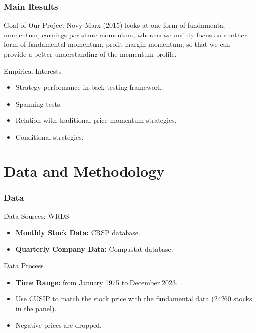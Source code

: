 \documentclass{beamer}
\begin{document}
\begin{frame}
    \frametitle{Main Results}
    \begin{block}{Goal of Our Project}
        {\color{blue} Novy-Marx (2015)} looks at one form of fundamental momentum, earnings per share momentum, 
        whereas we mainly focus on another form of fundamental momentum, profit margin momentum, so that we can provide a better understanding of the momentum profile.
    \end{block}
    \begin{block}{Empirical Interests}
        \begin{itemize}
            \item Strategy performance in back-testing framework.
            \item Spanning tests.
            \item Relation with traditional price momentum strategies.
            \item Conditional strategies.
        \end{itemize}
    \end{block}
\end{frame}

\section{Data and Methodology}
\begin{frame}
    \frametitle{Data}
    \begin{block}{Data Sources: WRDS}
        \begin{itemize}
            \item {\bf Monthly Stock Data:} CRSP database.
            \item {\bf Quarterly Company Data:} Compustat database.
        \end{itemize}
    \end{block}
    \begin{block}{Data Process}
        \begin{itemize}
            \item {\bf Time Range:} from January 1975 to December 2023.
            \item Use CUSIP to match the stock price with the fundamental data (24260 stocks in the panel).
            \item Negative prices are dropped.
        \end{itemize}
    \end{block}
\end{frame}
\end{document}
